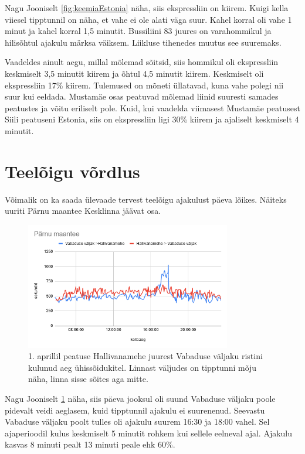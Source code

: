 Nagu Jooniselt \ref{fig:keemiaEstonia} näha, siis ekspressliin on kiirem. Kuigi kella viiesel tipptunnil on näha, et vahe ei ole alati väga suur. Kahel korral oli vahe 1 minut ja kahel korral 1,5 minutit. Bussiliini 83 juures on varahommikul ja hilisõhtul  ajakulu märksa väiksem. Liikluse tihenedes muutus see suuremaks. 

Vaadeldes ainult aegu, millal mõlemad sõitsid, siis hommikul oli ekspressliin keskmiselt 3,5 minutit kiirem ja õhtul 4,5 minutit kiirem. Keskmiselt oli ekspressliin 17\% kiirem. Tulemused on mõneti üllatavad, kuna vahe polegi nii suur kui eeldada. Mustamäe osas peatuvad mõlemad liinid suuresti samades peatustes ja võitu eriliselt pole. Kuid, kui vaadelda viimasest Mustamäe peatusest Siili peatuseni Estonia, siis on ekspressliin ligi 30\% kiirem ja ajaliselt keskmiselt 4 minutit.

\section{Teelõigu võrdlus}
Võimalik on ka saada ülevaade tervest teelõigu ajakulust päeva lõikes.
Näiteks uuriti Pärnu maantee Kesklinna jäävat osa.

\begin{figure}[h!]
    \centering
    \includegraphics[width=0.8\textwidth]{figures/parnumnt.png}
    \caption{1. aprillil peatuse Hallivanamehe juurest Vabaduse väljaku ristini kulunud aeg ühissõidukitel. Linnast väljudes on tipptunni mõju näha, linna sisse sõites aga mitte.}
    \label{fig:parnumnt}
\end{figure}

Nagu Jooniselt \ref{fig:parnumnt} näha, siis päeva jooksul oli suund Vabaduse väljaku poole pidevalt veidi aeglasem, kuid tipptunnil ajakulu ei suurenenud. Seevastu Vabaduse väljaku poolt tulles oli ajakulu suurem 16:30 ja 18:00 vahel. Sel ajaperioodil kulus keskmiselt 5 minutit rohkem kui sellele eelneval ajal. Ajakulu kasvas 8 minuti pealt 13 minuti peale ehk 60\%. 

